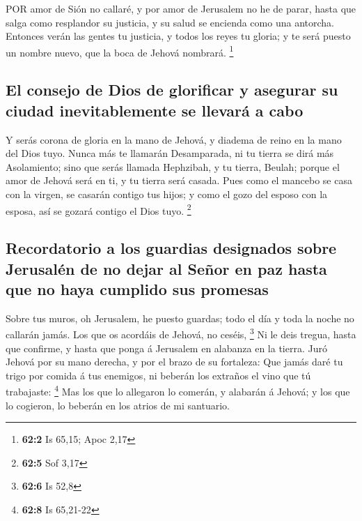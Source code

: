  POR amor de Sión no callaré, y por amor de Jerusalem no he
de parar, hasta que salga como resplandor su justicia, y su salud se
encienda como una antorcha.  Entonces verán las gentes tu
justicia, y todos los reyes tu gloria; y te será puesto un nombre nuevo,
que la boca de Jehová nombrará. \footnote{\textbf{62:2} Is 65,15; Apoc
  2,17}

\hypertarget{el-consejo-de-dios-de-glorificar-y-asegurar-su-ciudad-inevitablemente-se-llevaruxe1-a-cabo}{%
\subsection{El consejo de Dios de glorificar y asegurar su ciudad
inevitablemente se llevará a
cabo}\label{el-consejo-de-dios-de-glorificar-y-asegurar-su-ciudad-inevitablemente-se-llevaruxe1-a-cabo}}

 Y serás corona de gloria en la mano de Jehová, y diadema de
reino en la mano del Dios tuyo.  Nunca más te llamarán
Desamparada, ni tu tierra se dirá más Asolamiento; sino que serás
llamada Hephzibah, y tu tierra, Beulah; porque el amor de Jehová será en
ti, y tu tierra será casada.  Pues como el mancebo se casa
con la virgen, se casarán contigo tus hijos; y como el gozo del esposo
con la esposa, así se gozará contigo el Dios tuyo. \footnote{\textbf{62:5}
  Sof 3,17}

\hypertarget{recordatorio-a-los-guardias-designados-sobre-jerusaluxe9n-de-no-dejar-al-seuxf1or-en-paz-hasta-que-no-haya-cumplido-sus-promesas}{%
\subsection{Recordatorio a los guardias designados sobre Jerusalén de no
dejar al Señor en paz hasta que no haya cumplido sus
promesas}\label{recordatorio-a-los-guardias-designados-sobre-jerusaluxe9n-de-no-dejar-al-seuxf1or-en-paz-hasta-que-no-haya-cumplido-sus-promesas}}

 Sobre tus muros, oh Jerusalem, he puesto guardas; todo el
día y toda la noche no callarán jamás. Los que os acordáis de Jehová, no
ceséis, \footnote{\textbf{62:6} Is 52,8}  Ni le deis tregua,
hasta que confirme, y hasta que ponga á Jerusalem en alabanza en la
tierra.  Juró Jehová por su mano derecha, y por el brazo de
su fortaleza: Que jamás daré tu trigo por comida á tus enemigos, ni
beberán los extraños el vino que tú trabajaste: \footnote{\textbf{62:8}
  Is 65,21-22}  Mas los que lo allegaron lo comerán, y
alabarán á Jehová; y los que lo cogieron, lo beberán en los atrios de mi
santuario.

